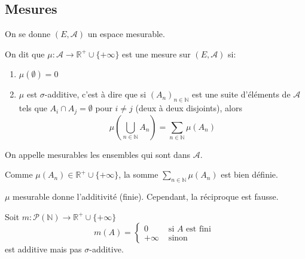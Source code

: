 
\subsection{Mesures}

On se donne $(E, \mathscr{A})$ un espace mesurable.

\begin{definition}[Mesure]
	On dit que $\mu : \mathscr{A} \to \mathbb{R}^+\cup \{+\infty\}$ est une mesure sur $(E, \mathscr{A})$ si:
	\begin{enumerate}
		\item $\mu(\emptyset) = 0$
		\item $\mu$ est $\sigma$-additive, c'est à dire que si $(A_n)_{n \in \mathbb{N}}$ est une suite d'éléments de $\mathscr{A}$
		      tels que $A_i \cap A_j = \emptyset$ pour $i \neq j$ (deux à deux disjoints), alors
		      \begin{equation*}
			      \mu\left(\bigcup\limits_{n \in \mathbb{N}} A_n\right) = \sum\limits_{n \in \mathbb{N}} \mu(A_n)
		      \end{equation*}
	\end{enumerate}
\end{definition}

\begin{remarque}
	On appelle mesurables les ensembles qui sont dans $\mathscr{A}$.
\end{remarque}

\begin{remarque}
	Comme $\mu (A_n) \in \mathbb{R}^+ \cup \{+\infty\}$, la somme $\sum\limits_{n \in \mathbb{N}} \mu(A_n)$ est bien définie.
\end{remarque}

\begin{remarque}
	$\mu$ mesurable donne l'additivité (finie). Cependant, la réciproque est fausse.
	\begin{example}
		Soit $m: \mathscr{P}(\mathbb{N}) \to \mathbb{R}^+ \cup \{+\infty\}$
		\begin{equation*}
			m(A) = \left\{
			\begin{array}{ll}
				0       & \text{ si } A \text{ est fini } \\
				+\infty & \text{ sinon }
			\end{array}
			\right.
		\end{equation*}
		est additive mais pas $\sigma$-additive.
	\end{example}
\end{remarque}

